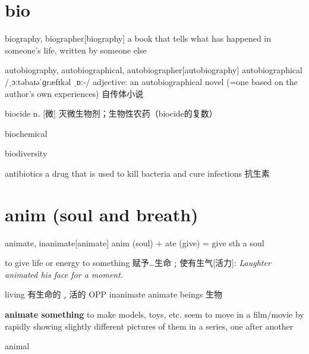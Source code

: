 \section{bio}

\begin{DefWord}{biography, biographer}[biography]
    a book that tells what has happened in someone’s life, written by someone else
\end{DefWord}

\begin{DefWord}{autobiography, autobiographical, autobiographer}[autobiography]
    autobiographical /ˌɔːtəbaɪəˈɡræfɪkəl ˌɒː-/ adjective:
    an autobiographical novel (=one based on the author’s own experiences) 自传体小说
\end{DefWord}

\begin{DefWord}{biocide}
    n. [微] 灭微生物剂；生物性农药（biocide的复数）
\end{DefWord}

\begin{DefWord}{biochemical}
\end{DefWord}

\begin{DefWord}{biodiversity}
\end{DefWord}

\begin{DefWord}{antibiotics}
    a drug that is used to kill bacteria and cure infections 抗生素
\end{DefWord}

\section{anim (soul and breath)}

\begin{DefWord}{animate, inanimate}[animate]
    anim (soul) + ate (give) = give sth a soul

    to give life or energy to something 赋予…生命﹔使有生气[活力]:
    \textit{Laughter animated his face for a moment.}

    living 有生命的﹐活的 OPP  inanimate
    animate beings 生物 

    \textbf{animate something} to make models, toys, etc. seem to move in a film/movie by rapidly showing slightly different pictures of them in a series, one after another
\end{DefWord}

\begin{DefWord}{animal}
\end{DefWord}

